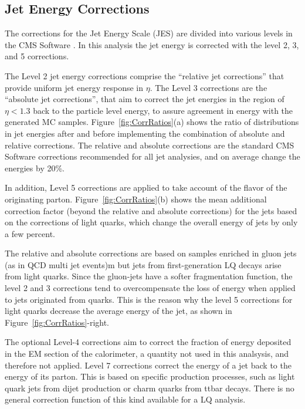 \subsection{Jet Energy Corrections}

The corrections for the Jet Energy Scale (JES) are divided into various levels in the CMS Software \cite{JES}.  
In this analysis the jet energy is corrected with the level 2, 3, and 5 corrections.

The Level 2 jet energy corrections comprise the 
``relative jet corrections'' that provide uniform jet energy response in $\eta$.  
The Level 3 corrections are the ``absolute jet corrections'', that aim to correct  the jet energies in the 
region of $\eta < 1.3$ back to the particle level energy, to assure agreement in energy with the generated MC samples. 
Figure~\ref{fig:CorrRatios}(a) shows the ratio of distributions in jet energies after and before implementing  
the combination of absolute and relative corrections.  
The relative and absolute corrections are the standard CMS Software corrections recommended for all jet analysies,
and on average change the energies by 20\%.

In addition, Level 5 corrections are applied to take account of the flavor of the originating parton.
Figure~\ref{fig:CorrRatios}(b) shows the mean additional correction factor (beyond the relative and absolute corrections) 
for the jets based on the corrections of light quarks, which change the overall energy of jets by only a few percent.

The relative and absolute corrections are based on samples enriched in gluon jets (as in QCD multi jet events)m but jets from 
first-generation LQ decays arise from light quarks.  Since the gluon-jets have
a softer fragmentation function, the level 2 and 3 corrections tend to overcompensate the loss of energy when applied to jets originated 
from quarks. This is the reason why the level 5 corrections for light quarks decrease the average energy of the jet, 
as shown in Figure~\ref{fig:CorrRatios}-right. 

The optional Level-4 corrections aim to correct the fraction of energy deposited in the EM section of the calorimeter, 
a quantity not used in this analsysis, and therefore not applied.
Level 7 corrections correct the energy of a jet back to the energy of its parton.
This is based on specific production processes, such as light quark jets from dijet production or charm quarks from ttbar decays.  
There is no general correction function of this kind available for a LQ analysis.

